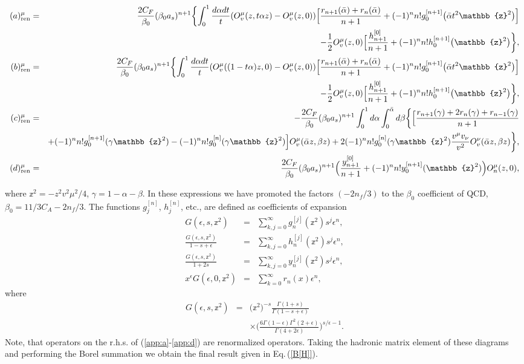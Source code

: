\documentclass[aps,prd,twocolumn,a4paper,superscriptaddress,10pt,showpacs,notitlepage,floatfix]{revtex4-1}
\begin{document}
\begin{widetext}
\begin{eqnarray}
(a)^\mu_{\text{ren}}&=&\frac{2C_F}{\beta_0}(\beta_0 a_s)^{n+1}\biggl\{\int_0^1 \frac{d\alpha dt}{t} (O_v^\mu(z,t\alpha z)-O_v^\mu(z,0))\Big[
\frac{r_{n+1}(\bar \alpha)+r_n(\bar \alpha)}{n+1}+(-1)^nn!g_0^{[n+1]}\big(\bar \alpha t^2 \mathbb{z}^2\big)\Big]
\\\nonumber && 
\hfill-\frac{1}{2}O_v^\mu(z,0)\Big[\frac{h_{n+1}^{[0]}}{n+1}+(-1)^nn!h_0^{[n+1]}\big(\mathbb{z}^2\big)\biggr\},
\\
(b)^\mu_{\text{ren}}&=&\frac{2C_F}{\beta_0}(\beta_0 a_s)^{n+1}\biggl\{\int_0^1\frac{d\alpha dt}{t}  (O_v^\mu((1-t\alpha) z,0)-O_v^\mu(z,0))\Big[
\frac{r_{n+1}(\bar \alpha)+r_n(\bar \alpha)}{n+1}+(-1)^nn!g_0^{[n+1]}\big(\bar \alpha t^2\mathbb{z}^2\big)\Big]
\\\nonumber && 
\hfill-\frac{1}{2}O_v^\mu(z,0)\Big[\frac{h_{n+1}^{[0]}}{n+1}+(-1)^nn!h_0^{[n+1]}\big(\mathbb{z}^2\big)\biggr\},
\\
(c)^\mu_{\text{ren}}&=&-\frac{2C_F}{\beta_0}(\beta_0 a_s)^{n+1}\int_0^1 d\alpha \int_0^{\bar \alpha} d\beta\biggl\{\Big[\frac{r_{n+1}(\gamma)+2r_n(\gamma)+r_{n-1}(\gamma)}{n+1}
\\\nonumber && +(-1)^nn!g_0^{[n+1]}(\gamma \mathbb{z}^2)-(-1)^nn!g_0^{[n]}(\gamma \mathbb{z}^2)\Big]O_v^\mu(\bar \alpha z,\beta z)
+2(-1)^n n!g_0^{[n]}(\gamma \mathbb{z}^2)\frac{v^\mu v_\nu}{v^2}O_v^\nu(\bar \alpha z,\beta z)\biggr\},
\\\label{app:d}
(d)^\mu_{\text{ren}}&=&\frac{2C_F}{\beta_0}(\beta_0 a_s)^{n+1}\Big(\frac{y_{n+1}^{[0]}}{n+1}+(-1)^nn!y_0^{[n+1]}(\mathbb{z}^2)\Big)O_n^{\mu}(z,0),
\end{eqnarray}
\end{widetext}
where $\mathbb{z}^2=-z^2 v^2\mu^2/4$, $\gamma=1-\alpha-\beta$. In these expressions we have promoted the factors $(-2n_f/3)$ to the $\beta_0$ coefficient of QCD, $\beta_0=11/3C_A-2n_f/3$. The functions $g_j^{[n]}$, $h_j^{[n]}$, etc., are defined as coefficients of expansion
\begin{eqnarray}
G(\epsilon,s,\mathbb{z}^2)&=&\sum_{k,j=0}^\infty g_n^{[j]}(\mathbb{z}^2)s^j \epsilon^n,
\\
\frac{G(\epsilon,s,\mathbb{z}^2)}{1-s+\epsilon}&=&\sum_{k,j=0}^\infty h_n^{[j]}(\mathbb{z}^2)s^j \epsilon^n,
\\
\frac{G(\epsilon,s,\mathbb{z}^2)}{1+2s}&=&\sum_{k,j=0}^\infty y_n^{[j]}(\mathbb{z}^2)s^j \epsilon^n,
\\
x^\epsilon G(\epsilon,0,\mathbb{z}^2)&=&\sum_{k=0}^\infty r_n(x) \epsilon^n,
\end{eqnarray}
where
\begin{eqnarray}
G(\epsilon,s,\mathbb{z}^2)&=&\Big(\mathbb{z}^2\Big)^{-s}\frac{\Gamma(1+s)}{\Gamma(1-s+\epsilon)}
\\\nonumber && \times \Bigg(\frac{6 \Gamma(1-\epsilon)\Gamma^2(2+\epsilon)}{\Gamma(4+2\epsilon)}\Bigg)^{s/\epsilon-1}.
\end{eqnarray}
Note, that operators on the r.h.s. of (\ref{app:a}-\ref{app:d}) are renormalized operators. Taking the hadronic matrix element of these diagrams and performing the Borel summation we obtain the final result given in Eq.\,(\ref{B[H]}).
\end{document}
